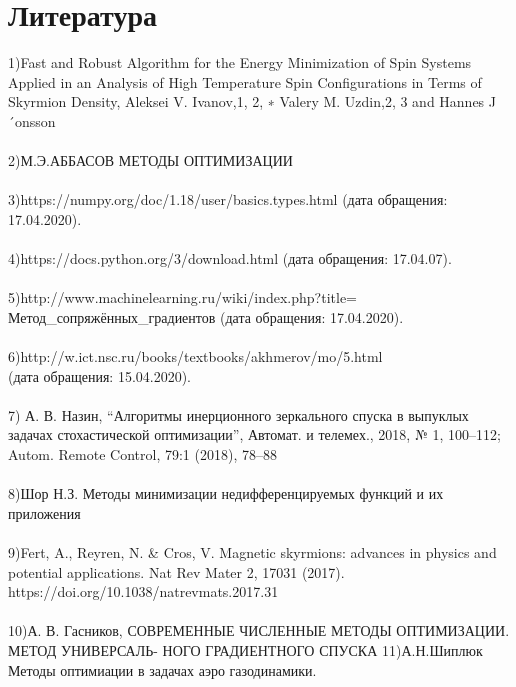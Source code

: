 \documentclass[ 12pt,x11names]{article}
\begin{document}
\section{Литература}
1)Fast and Robust Algorithm for the Energy Minimization of Spin Systems Applied in
an Analysis of High Temperature Spin Configurations in Terms of Skyrmion Density, Aleksei V. Ivanov,1, 2, ∗ Valery M. Uzdin,2, 3 and Hannes J´onsson\\
\\
2)М.Э.АББАСОВ
МЕТОДЫ ОПТИМИЗАЦИИ\\
\\
3)https://numpy.org/doc/1.18/user/basics.types.html (дата обращения: 17.04.2020).\\
\\
4)https://docs.python.org/3/download.html (дата обращения: 17.04.07).\\
\\
5)http://www.machinelearning.ru/wiki/index.php?title=\\
Метод\_сопряжённых\_градиентов (дата обращения: 17.04.2020).\\
\\
6)http://w.ict.nsc.ru/books/textbooks/akhmerov/mo/5.html\\
(дата обращения: 15.04.2020).\\
\\
7)  А. В. Назин, “Алгоритмы инерционного зеркального спуска в выпуклых задачах стохастической оптимизации”, Автомат. и телемех., 2018, № 1, 100–112; Autom. Remote Control, 79:1 (2018), 78–88\\
\\
8)Шор Н.З. Методы минимизации недифференцируемых функций и их приложения\\
\\
9)Fert, A., Reyren, N. & Cros, V. Magnetic skyrmions: advances in physics and potential applications. Nat Rev Mater 2, 17031 (2017).\\ https://doi.org/10.1038/natrevmats.2017.31\\
\\
10)А. В. Гасников, СОВРЕМЕННЫЕ ЧИСЛЕННЫЕ МЕТОДЫ ОПТИМИЗАЦИИ. МЕТОД УНИВЕРСАЛЬ-
НОГО ГРАДИЕНТНОГО СПУСКА
11)А.Н.Шиплюк Методы оптимиации в задачах аэро газодинамики.
\end{document}
